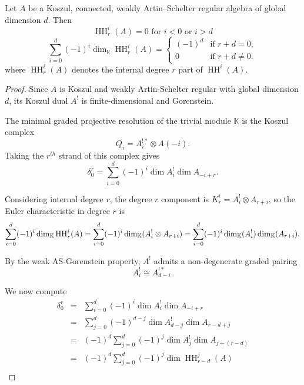 \documentclass{amsart}
\DeclareMathOperator{\Hom}{Hom}
\def\HH{\operatorname{HH}}
\begin{document}
\begin{proposition}
Let \( A \) be a Koszul, connected, weakly Artin–Schelter regular algebra of global dimension \( d \). Then
    $$\HH^i_r(A) = 0 \mbox{ for } i < 0 \mbox{ or }i>d$$
\[
\sum_{i=0}^d (-1)^i \dim_{\mathbb{K}} \HH^i_r(A) = 
\begin{cases}
(-1)^d & \text{if } r + d = 0, \\
0 & \text{if } r + d \neq 0.
\end{cases}
\]
where \( \HH^i_r(A) \) denotes the internal degree $r$ part of \( \HH^i(A) \).
\end{proposition}
\begin{proof}
\setcounter{equation}{0} %

Since \( A \) is Koszul and weakly Artin-Schelter regular with global dimension \( d \), its Koszul dual \( A^! \) is finite-dimensional and Gorenstein.

The minimal graded projective resolution of the trivial module \(\mathbb{K}\) is the Koszul complex
\[
Q_i = A^{!*}_i \otimes A(-i).
\]
Taking the $r^{th}$ strand of this complex gives
$$\delta_0^r = \sum_{i=0}^d(-1)^i \dim A_i^{!} \dim A_{-i+r}.$$

Considering internal degree \( r \), the degree \( r \) component is \( K^i_r = A^!_i \otimes A_{r+i} \), so the Euler characteristic in degree \( r \) is
\begin{equation}\label{eq:2}
\sum_{i=0}^d (-1)^i \dim_{\mathbb K} \HH^i_r(A) = \sum_{i=0}^d (-1)^i \dim_\mathbb K (A^!_i \otimes A_{r+i})\\
= \sum_{i=0}^d (-1)^i \dim_\mathbb K (A^!_i)\dim_\mathbb{K} (A_{r+i}).
\end{equation}



By the weak AS-Gorenstein property, \(A^!\) admits a non-degenerate graded pairing
\[
A^!_i \cong A^{!*}_{d-i}.
\]

We now compute \begin{eqnarray*}
    \delta_0^r & = &  \sum_{i=0}^d(-1)^i \dim A_i^{!} \dim A_{-i+r} \\
& = & \sum_{j=0}^d(-1)^{d-j} \dim A_{d-j}^{!} \dim A_{r-d+j} \\
& = & (-1)^d\sum_{j=0}^d(-1)^j \dim A_{j}^{!} \dim A_{j+(r-d)} \\
& = & (-1)^d\sum_{j=0}^d(-1)^j \dim \HH^j_{r-d}(A) \\
\end{eqnarray*}


\end{proof}
\end{document}
